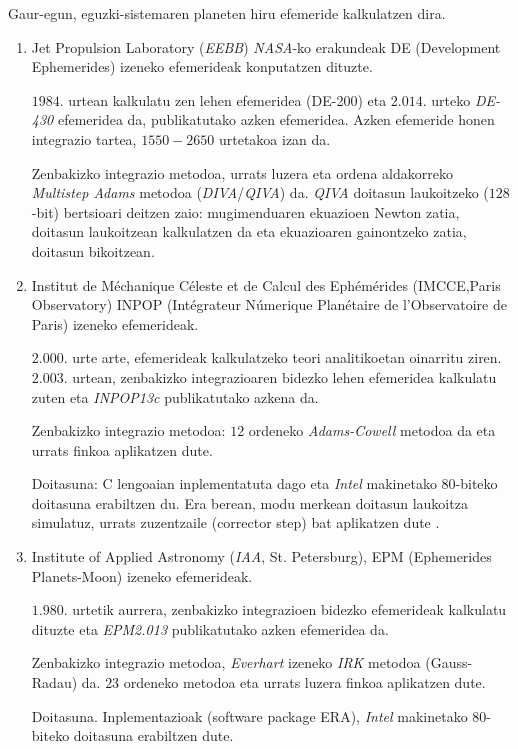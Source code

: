 Gaur-egun, eguzki-sistemaren planeten hiru efemeride kalkulatzen dira.
\begin{enumerate}
\item Jet Propulsion Laboratory (\emph{EEBB}) \emph{NASA}-ko erakundeak DE (Development Ephemerides) izeneko efemerideak konputatzen dituzte.

      $1984$. urtean kalkulatu zen lehen efemeridea (DE-200) eta $2.014$. urteko \emph{DE-430} \cite{Folkner2014} efemeridea da, publikatutako azken efemeridea. Azken efemeride honen integrazio tartea, $1550-2650$ urtetakoa izan da.

      Zenbakizko integrazio metodoa, urrats luzera eta  ordena aldakorreko \emph{Multistep Adams} metodoa \cite{Krogh1997} (\emph{DIVA}/\emph{QIVA}) da. \emph{QIVA} doitasun laukoitzeko ($128$-bit) bertsioari deitzen zaio: mugimenduaren ekuazioen Newton zatia, doitasun laukoitzean kalkulatzen da eta ekuazioaren gainontzeko zatia, doitasun bikoitzean.

\item Institut de Méchanique Céleste et de Calcul des Ephémérides (IMCCE,Paris Observatory) INPOP (Intégrateur Númerique Planétaire de l'Observatoire de Paris) izeneko efemerideak.
      
      $2.000$. urte arte, efemerideak kalkulatzeko teori analitikoetan oinarritu ziren. $2.003$. urtean, zenbakizko integrazioaren bidezko lehen efemeridea kalkulatu zuten eta \emph{INPOP13c}  \cite[$2.014$]{Fienga2008} publikatutako azkena da.
           
	  Zenbakizko integrazio metodoa: $12$ ordeneko \emph{Adams-Cowell} metodoa da eta urrats finkoa aplikatzen dute.
	  
	  Doitasuna: C lengoaian inplementatuta dago eta \emph{Intel} makinetako $80$-biteko doitasuna erabiltzen du. Era berean, modu merkean  doitasun laukoitza simulatuz, urrats zuzentzaile (corrector step) bat aplikatzen dute \cite{Fienga2008}.  
	  
  
\item Institute of Applied Astronomy (\emph{IAA}, St. Petersburg), EPM (Ephemerides Planets-Moon) izeneko efemerideak.
      
      $1.980$. urtetik aurrera, zenbakizko integrazioen bidezko efemerideak kalkulatu dituzte eta  \emph{EPM2.013}  \cite[2.014]{Pitjeva2014} publikatutako azken efemeridea da.
      
      Zenbakizko integrazio metodoa, \emph{Everhart} izeneko \emph{IRK} metodoa (Gauss-Radau) da. $23$ ordeneko metodoa eta urrats luzera finkoa aplikatzen dute.
            
      Doitasuna. Inplementazioak (software package ERA), \emph{Intel} makinetako $80$-biteko doitasuna erabiltzen dute.
      
\end{enumerate}


